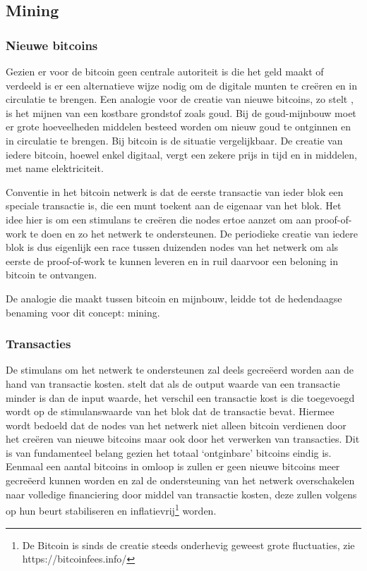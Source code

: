	\subsection{Mining}
		\subsubsection{Nieuwe bitcoins}
		Gezien er voor de bitcoin geen centrale autoriteit is die het geld maakt of verdeeld is er een alternatieve wijze nodig om de digitale munten te creëren en in circulatie te brengen. Een analogie voor de creatie van nieuwe bitcoins, zo stelt \textcite{Nakamoto2008}, is het mijnen van een kostbare grondstof zoals goud. Bij de goud-mijnbouw moet er grote hoeveelheden middelen besteed worden om nieuw goud te ontginnen en in circulatie te brengen. Bij bitcoin is de situatie vergelijkbaar. De creatie van iedere bitcoin, hoewel enkel digitaal, vergt een zekere prijs in tijd en in middelen, met name elektriciteit.
		
		Conventie in het bitcoin netwerk is dat de eerste transactie van ieder blok een speciale transactie is, die een munt toekent aan de eigenaar van het blok. Het idee hier is om een stimulans te creëren die nodes ertoe aanzet om aan proof-of-work te doen en zo het netwerk te ondersteunen. De periodieke creatie van iedere blok is dus eigenlijk een race tussen duizenden nodes van het netwerk om als eerste de proof-of-work te kunnen leveren en in ruil daarvoor een beloning in bitcoin te ontvangen. 
		
		De analogie die \textcite{Nakamoto2008} maakt tussen bitcoin en mijnbouw, leidde tot de hedendaagse benaming voor dit concept: mining. 
		
		\subsubsection{Transacties}
		De stimulans om het netwerk te ondersteunen zal deels gecreëerd worden aan de hand van transactie kosten. \textcite{Nakamoto2008} stelt dat als de output waarde van een transactie minder is dan de input waarde, het verschil een transactie kost is die toegevoegd wordt op de stimulanswaarde van het blok dat de transactie bevat. Hiermee wordt bedoeld dat de nodes van het netwerk niet alleen bitcoin verdienen door het creëren van nieuwe bitcoins maar ook door het verwerken van transacties. Dit is van fundamenteel belang gezien het totaal ‘ontginbare’ bitcoins eindig is. Eenmaal een aantal bitcoins in omloop is zullen er geen nieuwe bitcoins meer gecreëerd kunnen worden en zal de ondersteuning van het netwerk overschakelen naar volledige financiering door middel van transactie kosten, deze zullen volgens \textcite{Nakamoto2008} op hun beurt stabiliseren en inflatievrij\footnote{De Bitcoin is sinds de creatie steeds onderhevig geweest grote fluctuaties, zie https://bitcoinfees.info/} worden.
		
